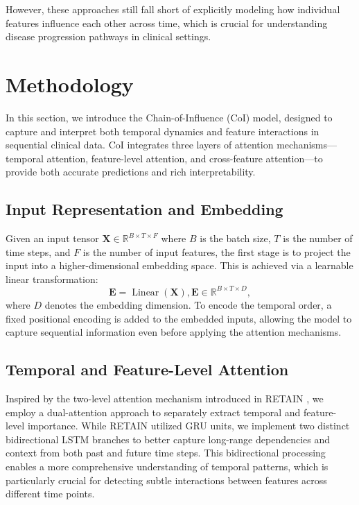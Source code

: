 \documentclass[letterpaper]{article}
\begin{document}
\begin{enumerate}
However, these approaches still fall short of explicitly modeling how individual features influence each other across time, which is crucial for understanding disease progression pathways in clinical settings.

\section{Methodology}

In this section, we introduce the Chain-of-Influence (CoI) model, designed to capture and interpret both temporal dynamics and feature interactions in sequential clinical data. CoI integrates three layers of attention mechanisms—temporal attention, feature-level attention, and cross-feature attention—to provide both accurate predictions and rich interpretability.

\subsection{Input Representation and Embedding}

Given an input tensor $\mathbf{X} \in \mathbb{R}^{B \times T \times F}$ where $B$ is the batch size, $T$ is the number of time steps, and $F$ is the number of input features, the first stage is to project the input into a higher-dimensional embedding space. This is achieved via a learnable linear transformation:
$$
\mathbf{E} = \operatorname{Linear}(\mathbf{X}), \mathbf{E} \in \mathbb{R}^{B \times T \times D},
$$
where $D$ denotes the embedding dimension. To encode the temporal order, a fixed positional encoding is added to the embedded inputs, allowing the model to capture sequential information even before applying the attention mechanisms.

\subsection{Temporal and Feature-Level Attention} 

Inspired by the two-level attention mechanism introduced in RETAIN \cite{choi2016retain}, we employ a dual-attention approach to separately extract temporal and feature-level importance. While RETAIN utilized GRU \cite{cho-etal-2014-learning} units, we implement two distinct bidirectional LSTM \cite{graves2005framewise} branches to better capture long-range dependencies and context from both past and future time steps. This bidirectional processing enables a more comprehensive understanding of temporal patterns, which is particularly crucial for detecting subtle interactions between features across different time points.


\end{enumerate}
\end{document}
